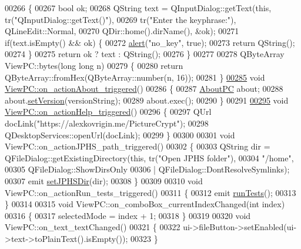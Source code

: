 \begin{DoxyCode}
00266 \{
00267     \textcolor{keywordtype}{bool} ok;
00268     QString text = QInputDialog::getText(\textcolor{keyword}{this}, tr(\textcolor{stringliteral}{"QInputDialog::getText()"}),
00269                                          tr(\textcolor{stringliteral}{"Enter the keyphrase:"}), QLineEdit::Normal,
00270                                          QDir::home().dirName(), &ok);
00271     \textcolor{keywordflow}{if}(text.isEmpty() && ok) \{
00272         \hyperlink{class_view_p_c_a7c467169467789561078abc9d4fe57bd}{alert}(\textcolor{stringliteral}{"no\_key"}, \textcolor{keyword}{true});
00273         \textcolor{keywordflow}{return} QString();
00274     \}
00275     \textcolor{keywordflow}{return} ok ? text : QString();
00276 \}
00277 
00278 QByteArray ViewPC::bytes(\textcolor{keywordtype}{long} \textcolor{keywordtype}{long} n)
00279 \{
00280     \textcolor{keywordflow}{return} QByteArray::fromHex(QByteArray::number(n, 16));
00281 \}
\hypertarget{viewpc_8cpp_source.tex_l00285}{}\hyperlink{class_view_p_c_a09a46da4d492eb3dde88f35dc58c997b}{00285} \textcolor{keywordtype}{void} \hyperlink{class_view_p_c_a09a46da4d492eb3dde88f35dc58c997b}{ViewPC::on\_actionAbout\_triggered}()
00286 \{
00287     \hyperlink{class_about_p_c}{AboutPC} about;
00288     about.\hyperlink{class_about_p_c_aa3815d4826d0c8d87122449537a0a4d5}{setVersion}(versionString);
00289     about.exec();
00290 \}
00291 
\hypertarget{viewpc_8cpp_source.tex_l00295}{}\hyperlink{class_view_p_c_a0d252ff4829260c6c76769fbd24b7cd7}{00295} \textcolor{keywordtype}{void} \hyperlink{class_view_p_c_a0d252ff4829260c6c76769fbd24b7cd7}{ViewPC::on\_actionHelp\_triggered}()
00296 \{
00297     QUrl docLink(\textcolor{stringliteral}{"https://alexkovrigin.me/PictureCrypt"});
00298     QDesktopServices::openUrl(docLink);
00299 \}
00300 
00301 \textcolor{keywordtype}{void} ViewPC::on\_actionJPHS\_path\_triggered()
00302 \{
00303     QString dir = QFileDialog::getExistingDirectory(\textcolor{keyword}{this}, tr(\textcolor{stringliteral}{"Open JPHS folder"}),
00304                                                     \textcolor{stringliteral}{"/home"},
00305                                                     QFileDialog::ShowDirsOnly
00306                                                     | QFileDialog::DontResolveSymlinks);
00307     emit \hyperlink{class_view_p_c_ae81085836c0c01bc9556a5b27eb8d19c}{setJPHSDir}(dir);
00308 \}
00309 
00310 \textcolor{keywordtype}{void} ViewPC::on\_actionRun\_tests\_triggered()
00311 \{
00312     emit \hyperlink{class_view_p_c_a96a6c95728bf20c64d2a8fe978495395}{runTests}();
00313 \}
00314 
00315 \textcolor{keywordtype}{void} ViewPC::on\_comboBox\_currentIndexChanged(\textcolor{keywordtype}{int} index)
00316 \{
00317     selectedMode = index + 1;
00318 \}
00319 
00320 \textcolor{keywordtype}{void} ViewPC::on\_text\_textChanged()
00321 \{
00322     ui->fileButton->setEnabled(ui->text->toPlainText().isEmpty());
00323 \}
\end{DoxyCode}
